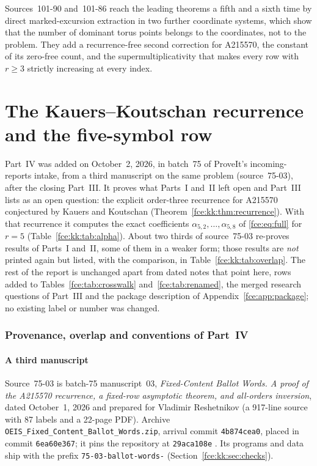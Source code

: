 \documentclass[11pt,a4paper]{article}
\numberwithin{equation}{section}
\theoremstyle{definition}\newtheorem{definition}[theorem]{Definition}
\theoremstyle{remark}\newtheorem{remark}[theorem]{Remark}
\begin{document}
Sources~101-90 and~101-86 reach the leading theorems a fifth and a sixth time
by direct marked-excursion extraction in two further coordinate systems,
which show that the number of dominant torus points belongs to the
coordinates, not to the problem. They add a recurrence-free second correction
for A215570, the constant of its zero-free count, and the supermultiplicativity
that makes every row with $r\ge3$ strictly increasing at every index.

\part{The Kauers--Koutschan recurrence and the five-symbol row}\label{fce:kk:part}

Part~IV was added on October~2, 2026, in batch~75 of ProveIt's
incoming-reports intake, from a third manuscript on the same problem
(source~75-03), after the closing Part~III. It proves what Parts~I and~II
left open and Part~III lists as an open question: the explicit
order-three recurrence for A215570 conjectured by Kauers and Koutschan
(Theorem~\ref{fce:kk:thm:recurrence}). With that recurrence it computes the
exact coefficients $\alpha_{5,2},\ldots,\alpha_{5,8}$ of
\eqref{fce:eq:full} for $r=5$ (Table~\ref{fce:kk:tab:alpha}). About two
thirds of source~75-03 re-proves results of Parts~I and~II, some of them in
a weaker form; those results are \emph{not} printed again but listed, with
the comparison, in Table~\ref{fce:kk:tab:overlap}. The rest of the report
is unchanged apart from dated notes that point here, rows added to
Tables~\ref{fce:tab:crosswalk} and~\ref{fce:tab:renamed}, the merged
research questions of Part~III and the package description of
Appendix~\ref{fce:app:package}; no existing label or number was changed.

\section{Provenance, overlap and conventions of Part~IV}\label{fce:kk:sec:intro}
\subsection{A third manuscript}\label{fce:kk:sec:source}
Source~75-03 is batch-75 manuscript~03, \emph{Fixed-Content Ballot Words.
A proof of the A215570 recurrence, a fixed-row asymptotic theorem, and
all-orders inversion}, dated October~1, 2026 and prepared for Vladimir
Reshetnikov (a 917-line source with 87 labels and a 22-page PDF). Archive
\texttt{OEIS\_Fixed\_Content\_Ballot\_Words.zip}, arrival commit
\texttt{4b874cea0}, placed in commit \texttt{6ea60e367}; it pins the
repository at \texttt{29aca108e} \cite{proveit75}. Its programs and data
ship with the prefix \texttt{75-03-ballot-words-}
(Section~\ref{fce:kk:sec:checks}).
\end{document}
